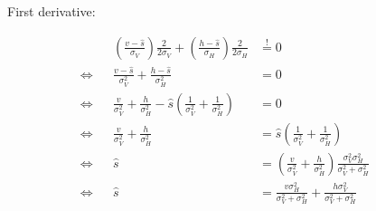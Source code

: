 \documentclass[../main/Notes.tex]{subfiles}
\begin{document}
First derivative:

\begin{align*}
& & \left(\frac{v-\hat{s}}{\sigma_{V}}\right) \frac{2}{2\sigma_{V}} + \left(\frac{h-\hat{s}}{\sigma_{H}}\right) \frac{2}{2\sigma_{H}} & \stackrel{!}{=}0 & & \\
\Leftrightarrow & & \frac{v-\hat{s}}{\sigma_{V}^{2}} + \frac{h-\hat{s}}{\sigma_{H}^{2}} & = 0 & & \\
\Leftrightarrow & & \frac{v}{\sigma_{V}^{2}} + \frac{h}{\sigma_{H}^{2}} -\hat{s} \left(\frac{1}{\sigma_{V}^{2}} + \frac{1}{\sigma_{H}^{2}}\right) & = 0 & & \\
\Leftrightarrow & & \frac{v}{\sigma_{V}^{2}} + \frac{h}{\sigma_{H}^{2}} & = \hat{s} \left(\frac{1}{\sigma_{V}^{2}} + \frac{1}{\sigma_{H}^{2}}\right) & & \\
\Leftrightarrow & & \hat{s} & = \left(\frac{v}{\sigma_{V}^{2}} + \frac{h}{\sigma_{H}^{2}}\right) \frac{\sigma_{V}^{2}\sigma_{H}^{2}}{\sigma_{V}^{2} + \sigma_{H}^{2}} & & \\
\Leftrightarrow & & \hat{s} & = \frac{v\sigma_{H}^{2}}{\sigma_{V}^{2} + \sigma_{H}^{2}} + \frac{h\sigma_{V}^{2}}{\sigma_{V}^{2} + \sigma_{H}^{2}} & &
\end{align*}
\end{document}
